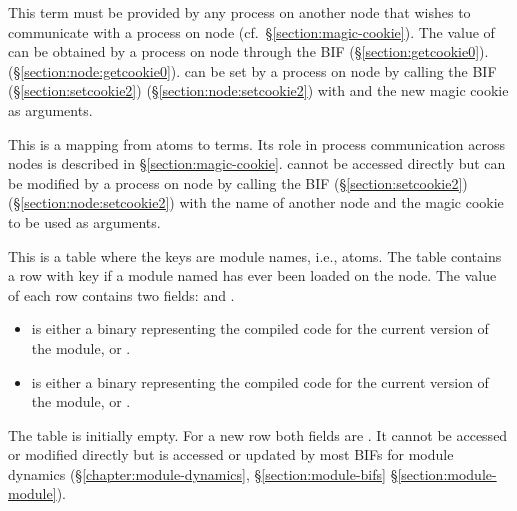\begin{Lentry}
\item[\T{magic_cookie[\Z{N}]}]
This term must be provided by any process on another node that wishes
to communicate with a process on node  (cf.\
\S\ref{section:magic-cookie}).  The value of 
can be obtained by a process on node \TZ{N} through the BIF
\ifOld {}
(\S\ref{section:getcookie0}).\fi
\ifStd {}
(\S\ref{section:node:getcookie0}).\fi
{} can be set by a process on node  by calling
the BIF
\ifOld {}
(\S\ref{section:setcookie2}) \fi
\ifStd {}
(\S\ref{section:node:setcookie2}) \fi
with  and the new magic cookie as arguments.

\item[\T{magic_cookies[\Z{N}]}]
\index{node!magic cookie|(}
This is a mapping from atoms to terms.  Its role in process communication
across nodes is described in \S\ref{section:magic-cookie}.
 cannot be accessed directly but
can be modified by a process on node  by calling
the BIF
\ifOld {}
(\S\ref{section:setcookie2}) \fi
\ifStd {}
(\S\ref{section:node:setcookie2}) \fi
with the name of another node and
the magic cookie to be used as arguments.

\item[\T{module_table[\Z{N}]}]
\index{node!module table|(}
This is a table where the keys are module names, i.e., atoms.  The table contains
a row with key  if a module named \TZ{Mod} has ever been loaded on the node.
The value \TZ{R} of each row contains two fields:
 and .
\begin{itemize}
\item {} is either a binary representing the compiled code
for the current version of the module, or .
\item {} is either a binary representing the compiled code
for the current version of the module, or .
\end{itemize}
The table is initially empty.  For a new row both fields are \T{none}.
It cannot be accessed or modified directly but is accessed or updated
by most BIFs for module
dynamics (\S\ref{chapter:module-dynamics},
\ifOld\S\ref{section:module-bifs}\fi
\ifStd\S\ref{section:module-module}\fi).


\end{Lentry}
